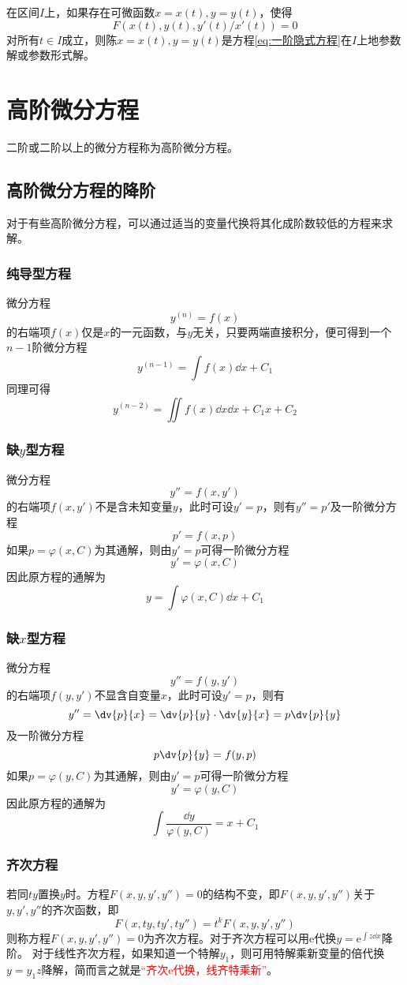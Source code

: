 在区间$I$上，如果存在可微函数$x=x(t),y=y(t)$，使得
\[ F(x(t),y(t),y'(t)/x'(t)) = 0 \]
对所有$t\in I$成立，则陈$x=x(t),y=y(t)$是方程\ref{eq:一阶隐式方程}在$I$上地参数解或参数形式解。

\section{高阶微分方程}
二阶或二阶以上的微分方程称为高阶微分方程。

\subsection{高阶微分方程的降阶}
对于有些高阶微分方程，可以通过适当的变量代换将其化成阶数较低的方程来求解。
\subsubsection{纯导型方程}
微分方程\[ y^{(n)} = f(x) \]
的右端项$f(x)$仅是$x$的一元函数，与$y$无关，只要两端直接积分，便可得到一个$n-1$阶微分方程
\[ y^{(n-1)} = \int f(x)\dd{x} + C_1 \]
同理可得
\[ y^{(n-2)} = \iint f(x)\dd{x} \dd{x} +C_1x + C_2 \]

\subsubsection{缺\texorpdfstring{$y$}{y}型方程}
微分方程
\[ y'' = f(x,y') \]
的右端项$f(x,y')$不是含未知变量$y$，此时可设$y'=p$，则有$y''=p'$及一阶微分方程
\[ p' = f(x,p) \]
如果$p=\varphi(x,C)$为其通解，则由$y'=p$可得一阶微分方程
\[ y' = \varphi(x,C) \]
因此原方程的通解为
\[ y = \int \varphi(x,C)\dd{x} + C_1 \]

\subsubsection{缺\texorpdfstring{$x$}{x}型方程}
微分方程
\[ y'' = f(y,y') \]
的右端项$f(y,y')$不显含自变量$x$，此时可设$y'=p$，则有
\[ y'' = \dv{p}{x}=\dv{p}{y}\cdot\dv{y}{x} = p\dv{p}{y} \]
及一阶微分方程
\[ p\dv{p}{y} = f(y,p) \]
如果$p=\varphi(y,C)$为其通解，则由$y'=p$可得一阶微分方程
\[ y' = \varphi(y,C) \]
因此原方程的通解为
\[ \int \frac{\dd{y}}{\varphi(y,C)} = x + C_1 \]

\subsubsection{齐次方程}
若同$ty$置换$y$时。方程$F(x,y,y',y'')=0$的结构不变，即$F(x,y,y',y'')$关于$y,y',y''$的齐次函数，即
\[ F(x,ty,ty',ty'') = t^k F(x,y,y',y'') \]
则称方程$F(x,y,y',y'')=0$为齐次方程。对于齐次方程可以用$\mathrm{e}$代换$y = \mathrm{e}^{\int z\dd{x}}$降阶。
对于线性齐次方程，如果知道一个特解$y_1$，则可用特解乘新变量的倍代换$y=y_1z$降解，简而言之就是\textcolor{red}{“齐次$\mathrm{e}$代换，线齐特乘新”}。

